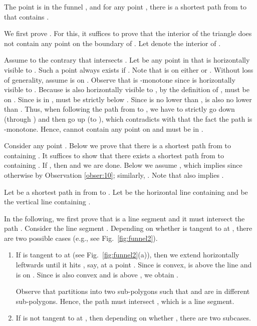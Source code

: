 \documentclass[english,runningheads,11pt]{llncs}
\newenvironment{proof}{\noindent {\textbf{Proof:}}\rm}{\hfill \rm}
\begin{document}
\begin{lemma}\label{lem:110}
The point  is in the funnel , and for any point , there is a shortest path
from  to  that contains .
\end{lemma}
\begin{proof}
We first prove . For this, it suffices to prove that the interior of the triangle
 does not contain any point on the boundary of .
Let  denote the interior of .

Assume to the contrary that  intersects . Let  be any point in
 that is horizontally visible to . Such a point 
always exists if . Note that  is on either 
or .
Without loss of generality, assume  is on .
Observe that  is -monotone since  is horizontally visible to .
Because  is also horizontally visible to , by the definition of ,  must be
on . Since  is in ,  must be strictly below . Since  is no
lower than ,  is also no lower than . Thus, when following the path
 from  to , we have to strictly go down (through ) and then go up
(to ), which contradicts with that the fact the path  is
-monotone. Hence,  cannot contain any point on  and  must be in .

Consider any point . Below we prove that there is a shortest path from
 to  containing . It suffices to show that there exists a shortest path from 
to  containing . If , then  and we are done. Below we assume
, which implies  since otherwise  by Observation
\ref{obser:10}; similarly, . Note that  also implies
.

Let  be a shortest path in  from  to . Let  be the horizontal line containing  and  be the vertical line containing .

In the following, we first prove that  is a line segment and it must intersect the path .
Consider the line segment . Depending on whether  is tangent
to  at , there are two possible cases (e.g., see Fig.~\ref{fig:funnel2}).

\begin{enumerate}
\item
If  is tangent to  at  (see Fig.~\ref{fig:funnel2}(a)), then we extend
 horizontally leftwards until it hits , say, at a point . Since  is convex,  is above the line  and  is on . Since  is also convex and  is above , we obtain .

Observe that  partitions  into two sub-polygons such that  and
 are in different sub-polygons. Hence, the path  must intersect
, which is a line segment.

\item
If  is not tangent to  at , then depending on whether , there are two subcases.


\end{enumerate}
\end{proof}
\end{document}
